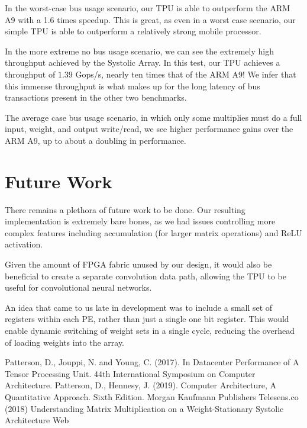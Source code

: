 \documentclass[11pt, conference, onecolumn]{IEEEtran}
\begin{document}
        In the worst-case bus usage scenario, our TPU is able to outperform the ARM A9
        with a 1.6 times speedup. This is great, as even in a worst case scenario, our
        simple TPU is able to outperform a relatively strong mobile processor.

        In the more extreme no bus usage scenario, we can see the extremely high throughput
        achieved by the Systolic Array. In this test, our TPU achieves a throughput of
        $1.39$ Gops/s, nearly ten times that of the ARM A9! We infer that this
        immense throughput is what makes up for the long latency of bus transactions
        present in the other two benchmarks.

        The average case bus usage scenario, in which only some multiplies must do a
        full input, weight, and output write/read, we see higher performance gains over
        the ARM A9, up to about a doubling in performance.

\section{Future Work}
    There remains a plethora of future work to be done. Our resulting implementation is
    extremely bare bones, as we had issues controlling more complex features including
    accumulation (for larger matrix operations) and ReLU activation.

    Given the amount of FPGA fabric unused by our design, it would also be beneficial to
    create a separate convolution data path, allowing the TPU to be useful for
    convolutional neural networks.

    An idea that came to us late in development was to include a small set of registers
    within each PE, rather than just a single one bit register. This would enable dynamic
    switching of weight sets in a single cycle, reducing the overhead of loading weights
    into the array.


\begin{thebibliography}{00}
 Patterson, D., Jouppi, N. and Young, C. (2017). In Datacenter Performance of A Tensor Processing Unit. 44th International Symposium on Computer Architecture.
 Patterson, D., Hennesy, J. (2019). Computer Architecture, A Quantitative Approach. Sixth Edition. Morgan Kaufmann Publishers
 Telesens.co (2018) Understanding Matrix Multiplication on a Weight-Stationary Systolic Architecture Web
\end{thebibliography}
\end{document}
